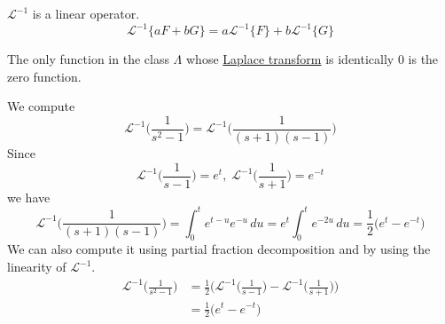 \documentclass{article}
\newcounter{theorem}[section]
\newcounter{example}[section]
\begin{document}
    \begin{theorem}
      \label{thm:linearity-of-the-inverse-laplace-transform}
    $\mathcal{L}^{-1}$ is a linear operator. 
    \begin{equation}
      \mathcal{L}^{-1} \{ a F + b G\} = a \mathcal{L}^{-1} \{F\} + b \mathcal{L}^{-1} \{G\}
    \end{equation}
    \end{theorem}

    \begin{corollary}
      \label{thm:injectivity-of-the-laplace-transform}
    The only function in the class $\Lambda$ whose \hyperref[def:laplace-transform]{Laplace transform} is identically $0$ is the zero function. 
    \end{corollary}

    \begin{example}[Inverting $1/(s^2-1)$]
      \label{ex:inverting-1s21}
    We compute 
    \begin{equation}
      \mathcal{L}^{-1} \bigg( \frac{1}{s^2 -1}\bigg) =\mathcal{L}^{-1} \bigg( \frac{1}{(s+1)(s-1)}\bigg)
    \end{equation}
    Since 
    \begin{equation}
      \mathcal{L}^{-1} \bigg(\frac{1}{s-1}\bigg) = e^t, \; \mathcal{L}^{-1}\bigg(\frac{1}{s+1}\bigg) = e^{-t}
    \end{equation}
    we have
    \begin{equation}
      \mathcal{L}^{-1} \bigg(\frac{1}{(s+1)(s-1)}\bigg) = \int_0^t e^{t-u} e^{-u} \,du = e^t \int_0^t e^{-2u} \,du = \frac{1}{2} \big(e^t - e^{-t}\big)
    \end{equation}
    We can also compute it using partial fraction decomposition and by using the linearity of $\mathcal{L}^{-1}$. 
    \begin{align*}
        \mathcal{L}^{-1} \bigg( \frac{1}{s^2-1}\bigg) & = \frac{1}{2} \Bigg( \mathcal{L}^{-1} \bigg( \frac{1}{s-1} \bigg) - \mathcal{L}^{-1} \bigg(\frac{1}{s+1}\bigg) \Bigg) \\
        & = \frac{1}{2} \big( e^t - e^{-t} \big) 
    \end{align*}
    \end{example}
\end{document}
